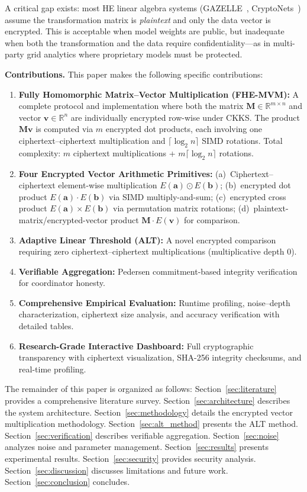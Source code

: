 \documentclass[conference,12pt]{IEEEtran}
\begin{document}
A critical gap exists: most HE linear algebra systems (GAZELLE~\cite{Juvekar2018}, CryptoNets~\cite{CryptoNets2016}) assume the transformation matrix is \emph{plaintext} and only the data vector is encrypted. This is acceptable when model weights are public, but inadequate when both the transformation and the data require confidentiality---as in multi-party grid analytics where proprietary models must be protected.

\textbf{Contributions.} This paper makes the following specific contributions:
\begin{enumerate}
    \item \textbf{Fully Homomorphic Matrix--Vector Multiplication (FHE-MVM):} A complete protocol and implementation where both the matrix $\mathbf{M} \in \mathbb{R}^{m \times n}$ and vector $\mathbf{v} \in \mathbb{R}^n$ are individually encrypted row-wise under CKKS. The product $\mathbf{Mv}$ is computed via $m$ encrypted dot products, each involving one ciphertext--ciphertext multiplication and $\lceil \log_2 n \rceil$ SIMD rotations. Total complexity: $m$ ciphertext multiplications + $m\lceil \log_2 n \rceil$ rotations.
    \item \textbf{Four Encrypted Vector Arithmetic Primitives:} (a)~Ciphertext--ciphertext element-wise multiplication $E(\mathbf{a}) \odot E(\mathbf{b})$; (b)~encrypted dot product $E(\mathbf{a}) \cdot E(\mathbf{b})$ via SIMD multiply-and-sum; (c)~encrypted cross product $E(\mathbf{a}) \times E(\mathbf{b})$ via permutation matrix rotations; (d)~plaintext-matrix/encrypted-vector product $\mathbf{M} \cdot E(\mathbf{v})$ for comparison.
    \item \textbf{Adaptive Linear Threshold (ALT):} A novel encrypted comparison requiring zero ciphertext--ciphertext multiplications (multiplicative depth 0).
    \item \textbf{Verifiable Aggregation:} Pedersen commitment-based integrity verification for coordinator honesty.
    \item \textbf{Comprehensive Empirical Evaluation:} Runtime profiling, noise--depth characterization, ciphertext size analysis, and accuracy verification with detailed tables.
    \item \textbf{Research-Grade Interactive Dashboard:} Full cryptographic transparency with ciphertext visualization, SHA-256 integrity checksums, and real-time profiling.
\end{enumerate}

The remainder of this paper is organized as follows: Section~\ref{sec:literature} provides a comprehensive literature survey. Section~\ref{sec:architecture} describes the system architecture. Section~\ref{sec:methodology} details the encrypted vector multiplication methodology. Section~\ref{sec:alt_method} presents the ALT method. Section~\ref{sec:verification} describes verifiable aggregation. Section~\ref{sec:noise} analyzes noise and parameter management. Section~\ref{sec:results} presents experimental results. Section~\ref{sec:security} provides security analysis. Section~\ref{sec:discussion} discusses limitations and future work. Section~\ref{sec:conclusion} concludes.
\end{document}
